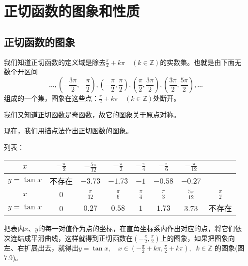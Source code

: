\section{正切函数的图象和性质}
\subsection{正切函数的图象}
我们知道正切函数的定义域是除去$\frac{\pi}{2}+k\pi\quad (k\in\mathbb{Z})$的实数集。也就是由下面无数个开区间
\[\ldots, \left(-\frac{3\pi}{2},-\frac{\pi}{2}\right),\left(-\frac{\pi}{2},\frac{\pi}{2}\right), \left(\frac{\pi}{2},\frac{3\pi}{2}\right), \left(\frac{3\pi}{2},\frac{5\pi}{2}\right), \ldots\]
组成的一个集，图象在这些点：$\frac{\pi}{2}+k\pi\quad (k\in\mathbb{Z})$处断开。

我们又知道正切函数是奇函数，故它的图象关于原点对称。

现在，我们用描点法作出正切函数的图象。

列表：
\begin{center}
\begin{tabular}{c|ccccccc}
\hline
$x$  &    $-\frac{\pi}{2}$  &    $-\frac{5\pi}{12}$  &    $-\frac{\pi}{3}$  &    $-\frac{\pi}{4}$  &    $-\frac{\pi}{6}$  &    $-\frac{\pi}{12}$  \\    
\hline
$y=\tan x$   & 不存在  & $-3.73$  & $-1.73$  & $-1$  & $-0.58$  & $-0.27$  \\
\hline
$x$  &    $0$  &    $\frac{\pi}{12}$  &    $\frac{\pi}{6}$  &    $\frac{\pi}{4}$  &    $\frac{\pi}{3}$  &    $\frac{5\pi}{12}$ & $\frac{\pi}{2}$ \\    
\hline
$y=\tan x$   & 0  & $0.27$  & $0.58$  & $1$  & $1.73$ & 3.73 & 不存在  \\
\hline
\end{tabular}    
\end{center}

把表内$x$、$y$的每一对值作为点的坐标，在直角坐标系内作出对应的点，将它们依次连结成平滑曲线，这样就得到正切函数在$\left(-\frac{\pi}{2},\frac{\pi}{2}\right)$上的图象，如果把图象向左、右扩展出去，就得出$y=\tan x,\quad x\in\left(-\frac{\pi}{2}+k\pi,\frac{\pi}{2}+k\pi\right),\;\; k\in \mathbb{Z}$ 的图象(图7.9)。

